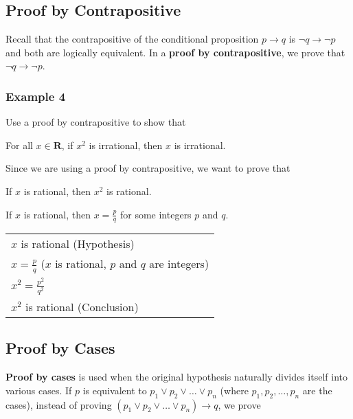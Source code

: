 \subsection*{Proof by Contrapositive}

Recall that the contrapositive of the conditional proposition $p \rightarrow q$ is $\lnot q \rightarrow \lnot p$ and both are logically equivalent.  In a \textbf{proof by contrapositive}, we prove that $\lnot q \rightarrow \lnot p$.

\subsubsection*{Example 4}

Use a proof by contrapositive to show that
\begin{center}
    For all $x \in \textbf{R}$, if $x^2$ is irrational, then $x$ is irrational.
\end{center}

Since we are using a proof by contrapositive, we want to prove that
\begin{center}
    If $x$ is rational, then $x^2$ is rational.
\end{center}

If $x$ is rational, then $x = \frac{p}{q}$ for some integers $p$ and $q$.

\begin{table}[h]
\centering
\begin{tabular}{l}
$x$ is rational (Hypothesis)\\
$x = \frac{p}{q}$ ($x$ is rational, $p$ and $q$ are integers)\\
$x^2 = \frac{p^2}{q^2}$\\
$x^2$ is rational (Conclusion)
\end{tabular}
\end{table}

\subsection*{Proof by Cases}

\textbf{Proof by cases} is used when the original hypothesis naturally divides itself into various cases.  If $p$ is equivalent to $p_1 \vee p_2 \vee \dots \vee p_n$ (where $p_1, p_2, \dots, p_n$ are the cases), instead of proving $(p_1 \vee p_2 \vee \dots \vee p_n) \rightarrow q$, we prove

